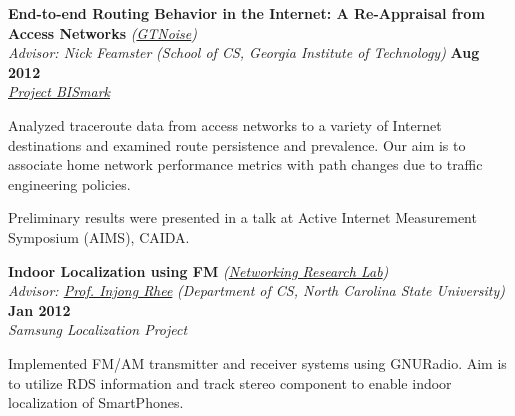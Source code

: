 \documentclass[margin,line]{resume}
\begin{document}
\begin{resume}
    \textbf{End-to-end Routing Behavior in the Internet: A Re-Appraisal from Access Networks}
    \emph{(\href{http://gtnoise.net/}{GTNoise})} \\
    \hspace{-1pt}\emph{Advisor: {Nick Feamster}}
    \emph{(School of CS, Georgia Institute of Technology)}			\hfill \textbf{Aug 2012} \\
    \hspace{-1pt}\emph{\href{http://projectbismark.net/}{Project BISmark}} 		\\\vspace{-4mm}
    \begin{list2}
    \item Analyzed traceroute data from access networks to a variety of Internet destinations and examined route persistence and prevalence. Our aim is to associate home network performance metrics with path changes due to traffic engineering policies.
    \item Preliminary results were presented in a talk at Active Internet Measurement Symposium (AIMS), CAIDA.
    \end{list2}
\vspace{-2mm}

    \textbf{Indoor Localization using FM}  \emph{(\href{http://research.csc.ncsu.edu/netsrv/}{Networking Research Lab})} \\
    \hspace{-1pt}\emph{Advisor: \href{http://www4.ncsu.edu/~rhee/}{Prof. Injong Rhee}}
    \emph{(Department of CS, North Carolina State University)}			\hfill \textbf{Jan 2012} \\
    \hspace{-1pt}\emph{Samsung Localization Project} 		\\\vspace{-4mm}
    \begin{list2}
    \item Implemented FM/AM transmitter and receiver systems using GNURadio. Aim is to utilize RDS information and track stereo component to enable indoor localization of SmartPhones.
    \end{list2}
\vspace{-2mm}


\end{resume}
\end{document}
